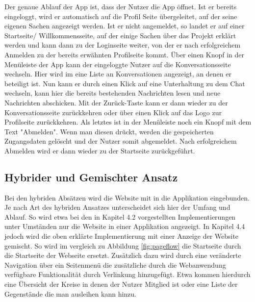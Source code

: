 Der genaue Ablauf der App ist, dass der Nutzer die App öffnet. Ist er bereits eingeloggt, wird er automatisch auf die Profil Seite übergeleitet, auf der seine eigenen Sachen angezeigt werden. Ist er nicht angemeldet, so landet er auf einer Startseite/ Willkommensseite, auf der einige Sachen über das Projekt erklärt werden und kann dann zu der Loginseite weiter, von der er nach erfolgreichem Anmelden zu der bereits erwähnten Profilseite kommt. Über einen Knopf in der Menüleiste der App kann der eingeloggte Nutzer auf die Konversationsseite wechseln. Hier wird im eine Liste an Konversationen angezeigt, an denen er beteiligt ist. Nun kann er durch einen Klick auf eine Unterhaltung zu dem Chat wechseln, kann hier die bereits bestehenden Nachrichten lesen und neue Nachrichten abschicken. Mit der Zurück-Taste kann er dann wieder zu der Konversationsseite zurückkehren oder über einen Klick auf das Logo zur Profilseite zurückkehren. Als letztes ist in der Menüleiste noch ein Knopf mit dem Text "Abmelden". Wenn man diesen drückt, werden die gespeicherten Zugangsdaten gelöscht und der Nutzer somit abgemeldet. Nach erfolgreichem Abmelden wird er dann wieder zu der Startseite zurückgeführt.

\subsection{Hybrider und Gemischter Ansatz}
Bei den hybriden Absätzen wird die Website mit in die Applikation eingebunden. Je nach Art des hybriden Ansatzes unterscheidet sich hier der Umfang und Ablauf. So wird etwa bei den in Kapitel 4.2 vorgestellten Implementierungen unter Umständen nur die Website in einer Applikation angezeigt. In Kapitel 4.4 jedoch wird die oben erklärte Implementierung mit einer Anzeige der Website gemischt. So wird im vergleich zu Abbildung \ref{fig:pageflow} die Startseite durch die Startseite der Webseite ersetzt. Zusätzlich dazu wird durch eine veränderte Navigation über ein Seitenmenü die zusätzliche durch die Webanwendung verfügbare Funktionalität durch Verlinkung hinzugefügt. Etwa kommen hierdurch eine Übersicht der Kreise in denen der Nutzer Mitglied ist oder eine Liste der Gegenstände die man ausleihen kann hinzu.


